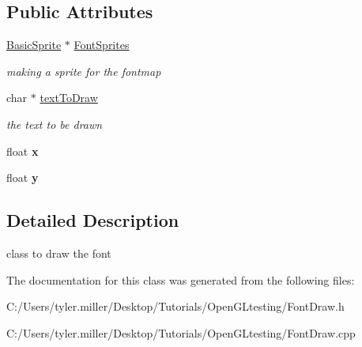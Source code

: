 \subsection*{Public Attributes}
\begin{DoxyCompactItemize}
\item 
\hypertarget{class_font_draw_a6f1d1280ec0deedd99f50da0db59f309}{}\hyperlink{class_basic_sprite}{Basic\+Sprite} $\ast$ \hyperlink{class_font_draw_a6f1d1280ec0deedd99f50da0db59f309}{Font\+Sprites}\label{class_font_draw_a6f1d1280ec0deedd99f50da0db59f309}

\begin{DoxyCompactList}\small\item\em making a sprite for the fontmap \end{DoxyCompactList}\item 
\hypertarget{class_font_draw_a203a14fcfcb57714a27ddfd1d874af90}{}char $\ast$ \hyperlink{class_font_draw_a203a14fcfcb57714a27ddfd1d874af90}{text\+To\+Draw}\label{class_font_draw_a203a14fcfcb57714a27ddfd1d874af90}

\begin{DoxyCompactList}\small\item\em the text to be drawn \end{DoxyCompactList}\item 
\hypertarget{class_font_draw_aeb5fb719a7a053db5d25baba6f278e11}{}float {\bfseries x}\label{class_font_draw_aeb5fb719a7a053db5d25baba6f278e11}

\item 
\hypertarget{class_font_draw_abeaa23a0b931c8b06f228f41161fc661}{}float {\bfseries y}\label{class_font_draw_abeaa23a0b931c8b06f228f41161fc661}

\end{DoxyCompactItemize}


\subsection{Detailed Description}
class to draw the font 

The documentation for this class was generated from the following files\+:\begin{DoxyCompactItemize}
\item 
C\+:/\+Users/tyler.\+miller/\+Desktop/\+Tutorials/\+Open\+G\+Ltesting/Font\+Draw.\+h\item 
C\+:/\+Users/tyler.\+miller/\+Desktop/\+Tutorials/\+Open\+G\+Ltesting/Font\+Draw.\+cpp\end{DoxyCompactItemize}
